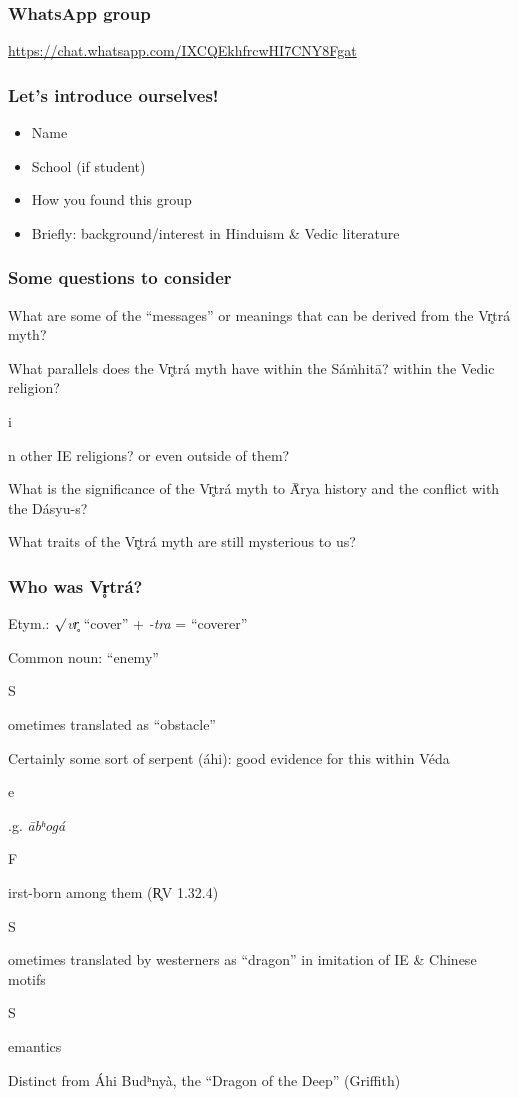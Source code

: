 \documentclass[pdf]{beamer}
\newcommand{\Subitem}[1]{{\setlength\itemindent{12pt} \item[-] #1}}
\newcommand{\Subsubitem}[1]{{\setlength\itemindent{24pt} \item[○] #1}}
\begin{document}
\begin{frame} \frametitle{WhatsApp group}
\begin{center}
	\href{https://chat.whatsapp.com/IXCQEkhfrcwHI7CNY8Fgat}{https://chat.whatsapp.com/IXCQEkhfrcwHI7CNY8Fgat}
\end{center}
\end{frame}

\begin{frame} \frametitle{Let's introduce ourselves!}
\begin{itemize}
	\item Name
	\item School (if student)
	\item How you found this group
	\item Briefly: background/interest in Hinduism \& Vedic literature
\end{itemize}
\end{frame}

\begin{frame}[label=questions] \frametitle{Some questions to consider}
\begin{itemize}
	\item What are some of the ``messages'' or meanings that can be derived from the Vr̥trá myth?
	\item What parallels does the Vr̥trá myth have within the Sáṁhitā? within the Vedic religion?
	\Subitem in other IE religions? or even outside of them?
	\item What is the significance of the Vr̥trá myth to Ā́rya history and the conflict with the Dásyu-s?
	\item What traits of the Vr̥trá myth are still mysterious to us?
\end{itemize}
\end{frame}

\begin{frame} \frametitle{Who was Vr̥trá?}
\begin{itemize}
	\item Etym.: $\surd$\textit{vr̥} ``cover'' + \textit{-tra} = ``coverer''
	\item Common noun: ``enemy''
	\Subitem Sometimes translated as ``obstacle''
	\item Certainly some sort of serpent (áhi): good evidence for this within Véda
	\Subitem e.g. \textit{ābʰogá}
	\Subitem First-born among them (R̥V 1.32.4)
	\Subitem Sometimes translated by westerners as ``dragon'' in imitation of IE \& Chinese motifs
	\Subsubitem Semantics
	\item Distinct from Áhi Budʰnyà, the ``Dragon of the Deep'' (Griffith)
\end{itemize}
\end{frame}
\end{document}
